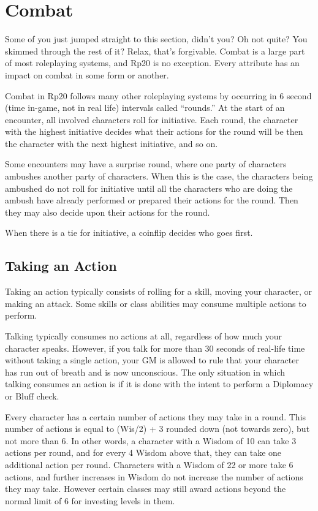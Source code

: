 \chapter{Combat}
Some of you just jumped straight to this section, didn’t you? Oh not quite? You skimmed through the rest of it? Relax, that’s forgivable. Combat is a large part of most roleplaying systems, and Rp20 is no exception. Every attribute has an impact on combat in some form or another.

Combat in Rp20 follows many other roleplaying systems by occurring in 6 second (time in-game, not in real life) intervals called ``rounds.'' At the start of an encounter, all involved characters roll for initiative. Each round, the character with the highest initiative decides what their actions for the round will be then the character with the next highest initiative, and so on.

Some encounters may have a surprise round, where one party of characters ambushes another party of characters. When this is the case, the characters being ambushed do not roll for initiative until all the characters who are doing the ambush have already performed or prepared their actions for the round. Then they may also decide upon their actions for the round.

When there is a tie for initiative, a coinflip decides who goes first.

\section{Taking an Action}
Taking an action typically consists of rolling for a skill, moving your character, or making an attack. Some skills or class abilities may consume multiple actions to perform.

Talking typically consumes no actions at all, regardless of how much your character speaks. However, if  you talk for more than 30 seconds of real-life time without taking a single action, your GM is allowed to rule that your character has run out of breath and is now unconscious. The only situation in which talking consumes an action is if it is done with the intent to perform a Diplomacy or Bluff check.

Every character has a certain number of actions they may take in a round. This number of actions is equal to (Wis/2) + 3 rounded down (not towards zero), but not more than 6. In other words, a character with a Wisdom of 10 can take 3 actions per round, and for every 4 Wisdom above that, they can take one additional action per round. Characters with a Wisdom of 22 or more take 6 actions, and further increases in Wisdom do not increase the number of actions they may take. However certain classes may still award actions beyond the normal limit of 6 for investing levels in them.

